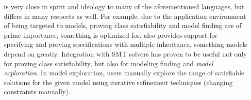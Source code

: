 \Klang{} is very close in spirit and ideology to many of the
aforementioned languages, but differs in many respects as well. For
example, due to the application environment of \Klang{} being targeted
to \sysml{} models, proving class satisfiability and model finding are
of prime importance, something \Klang{} is optimized for. \Klang{}
also provides support for specifying and proving specifications with
multiple inheritance, something \sysml{} models depend on
greatly. Integration with SMT solvers has proven to be useful not only
for proving class satisfiability, but also for modeling finding and
{\em model exploration}. In model exploration, users manually explore
the range of satisfiable solutions for the given model using iterative
refinement techniques (changing constraints manually). 
